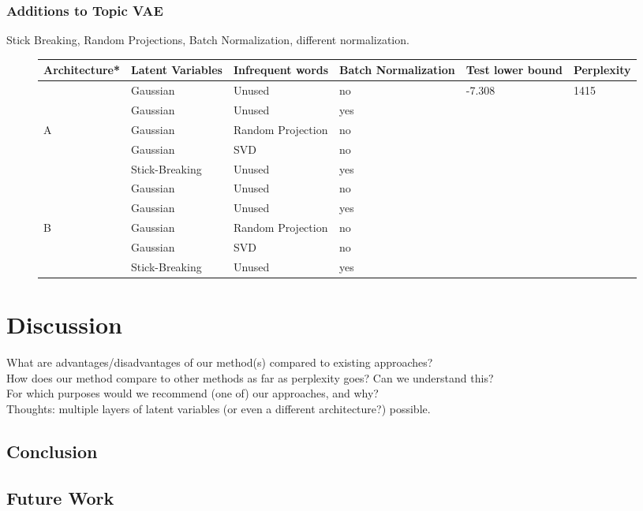 \documentclass{report}
\begin{document}
	\subsection{Additions to Topic VAE}\label{comp_methods}
	Stick Breaking, Random Projections, Batch Normalization, different normalization.
	\begin{figure}
		\begin{tabular}{l l l l | l l}\label{comp_ny} 		
			Architecture* & Latent Variables & Infrequent words & Batch Normalization & Test lower bound & Perplexity  	\\ \hline
				&	Gaussian	&	Unused				&	no	&	-7.308 	& 1415 \\ 
				&	Gaussian	&	Unused				&	yes  &	 	&  \\ 
			A	&	Gaussian	&	Random Projection	&	no	&	 	&   \\ 
				&	Gaussian 	&	SVD					& no	&	 	& \\ 
				&	Stick-Breaking	&	Unused	&	yes &	& \\  \hline
&	Gaussian	&	Unused				&	no	&	 	&  \\ 
&	Gaussian	&	Unused				&	yes  &	 	&  \\ 
B	&	Gaussian	&	Random Projection	&	no	&	 	&   \\ 
&	Gaussian 	&	SVD					& no	&	 	& \\ 
&	Stick-Breaking	&	Unused	&	yes &	& \\  \hline
	
		\end{tabular}
	\end{figure}
	

	

		
\chapter{Discussion}
What are advantages/disadvantages of our method(s) compared to existing approaches?\\
How does our method compare to other methods as far as perplexity goes? Can we understand this?\\
For which purposes would we recommend (one of) our approaches, and why? \\
Thoughts: multiple layers of latent variables (or even a different architecture?) possible.
\section{Conclusion}
\section{Future Work}

\end{document}
